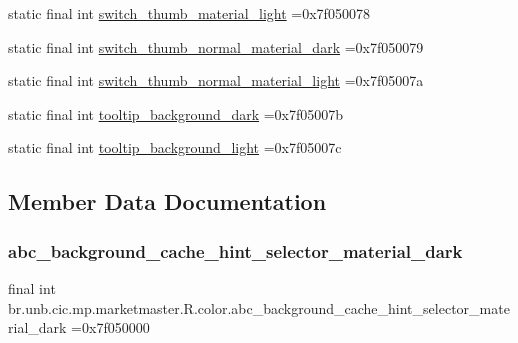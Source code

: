 \begin{DoxyCompactItemize}
static final int \mbox{\hyperlink{classbr_1_1unb_1_1cic_1_1mp_1_1marketmaster_1_1R_1_1color_a777d80fba7db4c3d03dc6c06eeb3e326}{switch\+\_\+thumb\+\_\+material\+\_\+light}} =0x7f050078
\item 
static final int \mbox{\hyperlink{classbr_1_1unb_1_1cic_1_1mp_1_1marketmaster_1_1R_1_1color_af8ee565e395de265142819cf6471be03}{switch\+\_\+thumb\+\_\+normal\+\_\+material\+\_\+dark}} =0x7f050079
\item 
static final int \mbox{\hyperlink{classbr_1_1unb_1_1cic_1_1mp_1_1marketmaster_1_1R_1_1color_ad5035c6245758ee0ff09c7b47c25cc6f}{switch\+\_\+thumb\+\_\+normal\+\_\+material\+\_\+light}} =0x7f05007a
\item 
static final int \mbox{\hyperlink{classbr_1_1unb_1_1cic_1_1mp_1_1marketmaster_1_1R_1_1color_a0d294cea6a913076983bf36505dcae0a}{tooltip\+\_\+background\+\_\+dark}} =0x7f05007b
\item 
static final int \mbox{\hyperlink{classbr_1_1unb_1_1cic_1_1mp_1_1marketmaster_1_1R_1_1color_afd457da37d6bdde38ea9e1c9fd33ed25}{tooltip\+\_\+background\+\_\+light}} =0x7f05007c
\end{DoxyCompactItemize}


\subsection{Member Data Documentation}
\mbox{\label{classbr_1_1unb_1_1cic_1_1mp_1_1marketmaster_1_1R_1_1color_ac006ece61b62832e727b0d618b803900}} 
\subsubsection{\texorpdfstring{abc\+\_\+background\+\_\+cache\+\_\+hint\+\_\+selector\+\_\+material\+\_\+dark}{abc\_background\_cache\_hint\_selector\_material\_dark}}
{\footnotesize\ttfamily final int br.\+unb.\+cic.\+mp.\+marketmaster.\+R.\+color.\+abc\+\_\+background\+\_\+cache\+\_\+hint\+\_\+selector\+\_\+material\+\_\+dark =0x7f050000\hspace{0.3cm}{\ttfamily [static]}}

